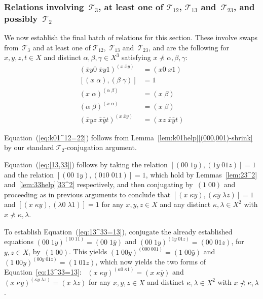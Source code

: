 \documentclass[a4paper,11pt]{article}
\numberwithin{equation}{section}
\newcommand{\eqstate}[1]{Equation~(\ref{#1})}
\newcommand{\swap}[2]{(#1\;#2)}
\newcommand{\Sw}[1]{\mathcal{T}_{#1}}
\begin{document}
\subsubsection{\boldmath Relations involving~$\Sw{3}$, at least one of
  $\Sw{12}$, $\Sw{13}$ and~$\Sw{23}$, and possibly~$\Sw{2}$}

We now establish the final batch of relations for this section.  These
involve swaps from~$\Sw{3}$ and at least one of $\Sw{12}$,~$\Sw{13}$
and~$\Sw{23}$, and are the following for $x,y,z,t \in X$ and distinct
$\alpha,\beta,\gamma \in X^{3}$ satisfying $x \not\prec
\alpha,\beta,\gamma$:
\begin{align}
  \swap{\bar{x}y0}{\bar{x}y1}^{\swap{x}{\bar{x}y}} &= \swap{x0}{x1}
  \label{eq:k01^12=22}
  \\
  [ \swap{x}{\alpha} , \swap{\beta}{\gamma} ] &= 1
  \label{eq:[13,33]}
  \\
  \swap{x}{\alpha}^{\swap{\alpha}{\beta}} &= \swap{x}{\beta}
  \label{eq:13^33=13}
  \\
  \swap{\alpha}{\beta}^{\swap{x}{\alpha}} &= \swap{x}{\beta}
  \label{eq:33^13=13}
  \\
  \swap{\bar{x}yz}{\bar{x}\bar{y}t}^{\swap{x}{\bar{x}y}} &=
  \swap{xz}{\bar{x}\bar{y}t}
  \label{eq:33^12=23}
\end{align}

\eqstate{eq:k01^12=22} follows from
Lemma~\ref{lem:k01help}\ref{(000,001)-shrink} by our standard
$\Sw{2}$-conjug\-ation argument.

\eqstate{eq:[13,33]} follows by taking the relation $[ \swap{00}{1y} ,
  \swap{1\bar{y}}{01z} ] = 1$ and the relation $[ \swap{00}{1y} ,
  \swap{010}{011} ] = 1$, which hold by Lemmas~\ref{lem:23^2}
and~\ref{lem:33help}\ref{33^2} respectively, and then conjugating
by~$\swap{1}{00}$ and proceeding as in previous arguments to conclude that
$[ \swap{x}{\kappa y} , \swap{\kappa\bar{y}}{\lambda z} ] = 1$ and
$[ \swap{x}{\kappa y} , \swap{\lambda0}{\lambda1} ] = 1$ for any
$x,y,z \in X$ and any distinct $\kappa,\lambda \in X^{2}$ with $x
\not\prec \kappa,\lambda$.

To establish \eqstate{eq:13^33=13}, conjugate the already established
equations $\swap{00}{1y}^{\swap{10}{11}} = \swap{00}{1\bar{y}}$ and
$\swap{00}{1y}^{\swap{1y}{01z}} = \swap{00}{01z}$, for $y,z \in X$,
by~$\swap{1}{00}$.  This yields $\swap{1}{00y}^{\swap{000}{001}} =
\swap{1}{00\bar{y}}$ and $\swap{1}{00y}^{\swap{00y}{01z}} =
\swap{1}{01z}$, which now yields the two forms of
Equation~\eqref{eq:13^33=13}: \ $\swap{x}{\kappa
  y}^{\swap{\kappa0}{\kappa1}} = \swap{x}{\kappa\bar{y}}$ and
$\swap{x}{\kappa y}^{\swap{\kappa y}{\lambda z}} = \swap{x}{\lambda
  z}$ for any $x,y,z \in X$ and distinct $\kappa,\lambda \in X^{2}$
with $x \not\prec \kappa,\lambda$.
\end{document}
